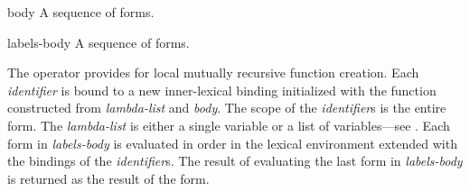 \begin{optDefinition}
\begin{arguments}
    \item[body] A sequence of forms.

    \item[labels-body] A sequence of forms.
\end{arguments}
%
\result%
The  operator provides for local mutually recursive function
creation.  Each {\em identifier} is bound to a new inner-lexical binding
initialized with the function constructed from {\em lambda-list} and {\em body}.
The scope of the {\em identifier}s is the entire 
form.  The
{\em lambda-list} is either a single variable or a list of variables---see
.  Each form in {\em labels-body} is evaluated in order in
the lexical environment extended with the bindings of the {\em identifier}s.
The result of evaluating the last form in {\em labels-body}\/ is returned as the
result of the  form.


\end{optDefinition}
